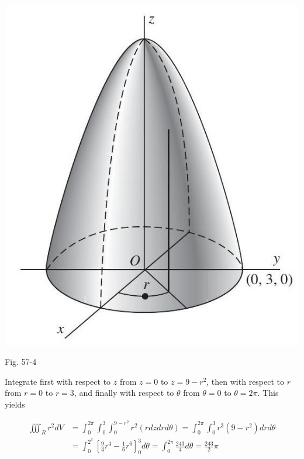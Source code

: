 \documentclass[10pt]{article}
\begin{document}
\begin{center}
\includegraphics[max width=\textwidth]{2024_04_20_fe2e8e718cc0fcd63d1bg-03}
\end{center}

Fig. 57-4

Integrate first with respect to $z$ from $z=0$ to $z=9-r^{2}$, then with respect to $r$ from $r=0$ to $r=3$, and finally with respect to $\theta$ from $\theta=0$ to $\theta=2 \pi$. This yields

$$
\begin{aligned}
\iiint_{R} r^{2} d V & =\int_{0}^{2 \pi} \int_{0}^{3} \int_{0}^{9-r^{2}} r^{2}(r d z d r d \theta)=\int_{0}^{2 \pi} \int_{0}^{3} r^{3}\left(9-r^{2}\right) d r d \theta \\
& =\int_{0}^{2^{\pi}}\left[\frac{9}{4} r^{4}-\frac{1}{6} r^{6}\right]_{0}^{3} d \theta=\int_{0}^{2 \pi} \frac{243}{4} d \theta=\frac{243}{2} \pi
\end{aligned}
$$
\end{document}
